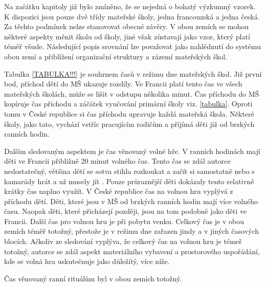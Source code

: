 	Na začátku kapitoly již bylo zmíněno, že se nejedná o bohatý výzkumný vzorek. K dispozici jsou pouze dvě třídy mateřské školy, jedna francouzská a jedna česká. Za těchto podmínek nelze stanovovat obecné závěry. V obou zemích se mohou některé aspekty měnit školu od školy, jiné však zůstavají jako vzor, který platí téměř všude. Následující popis srovnání lze považovat jako nahlédnutí do systému obou zemí a přiblížení organizační struktury a zázemí mateřských škol.


	Tabulka \ref{TABULKA!!!} je souhrnem časů v režimu dne mateřských škol. Již první bod, příchod dětí do MŠ ukazuje rozdíly. Ve Francii platí tento čas ve všech mateřských školách, může se lišit v odstupu několika minut. Čas příchodu do MŠ kopíruje čas příchodu a záčátek vyučování primární školy viz. \ref{tabulka}. Oproti tomu v České republice si čas příchodu upravuje každá mateřská škola. Některé školy, jako tato, vychází vstříc pracujícím rodičům a příjímá děti již od brzkých ranních hodin.

	Dalším sledovaným aspektem je čas věnovaný volné hře. V ranních hodinách mají děti ve Francii přibližně 20 minut volného čas. Tento čas se zdál autorce nedostatečný, většina dětí se sotva stihla rozkoukat a začít si samostatně nebo s kamarády hrát a už musely jít . Pouze průraznější děti dokázaly tento relativně krátky čas naplno využít.  V České republice čas na volnou hru vyplývá z příchodu dětí. Děti, které jsou v MŠ od brzkých ranních hodin mají více volného času. Naopak děti, které přicházejí později, jsou na tom podobně jako děti ve Francii. 
	Další čas pro volnou hru je při pobytu venku. Celkový čas je v obou zemích téměř totožný, přestože je v režimu dne zařazen jindy a v jiných časových blocích. Ačkoliv ze sledování vyplýva, že celkový čas na volnou hru je témeř totožný, autorce se zdál aspekt materiálního vybavení a prostorového uspořádání, kde se volná hra uskutečnuje jako důležítý, více níže.

	Čas věnovaný ranní rituálům byl v obou zemích totožný. 

	








